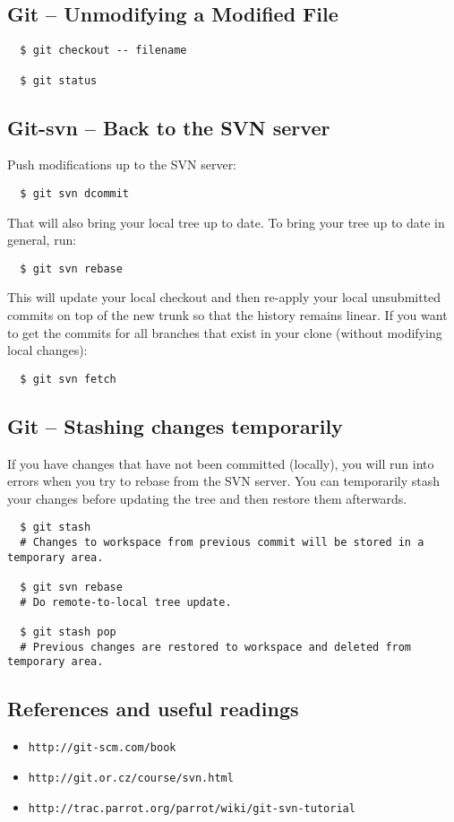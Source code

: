 \documentclass[11pt,twoside]{article}
\begin{document}
\subsection*{Git -- Unmodifying a Modified File}

\begin{verbatim}
  $ git checkout -- filename

  $ git status
\end{verbatim}

\subsection*{Git-svn -- Back to the SVN server}

Push modifications up to the SVN server:
\begin{verbatim}
  $ git svn dcommit
\end{verbatim}
That will also bring your local tree up to date. To bring your tree up to date in general, run:
\begin{verbatim}
  $ git svn rebase
\end{verbatim}
This will update your local checkout and then re-apply your local unsubmitted commits on top of the new trunk so that the history remains linear.
If you want to get the commits for all branches that exist in your clone (without modifying local changes):
\begin{verbatim}
  $ git svn fetch
\end{verbatim}

\subsection*{Git -- Stashing changes temporarily}

If you have changes that have not been committed (locally), you will run into errors when you try to rebase from the SVN server.
You can temporarily stash your changes before updating the tree and then restore them afterwards.

\begin{verbatim}
  $ git stash
  # Changes to workspace from previous commit will be stored in a temporary area.

  $ git svn rebase
  # Do remote-to-local tree update.

  $ git stash pop
  # Previous changes are restored to workspace and deleted from temporary area.
\end{verbatim}

\subsection*{References and useful readings}

\begin{itemize}
\item \verb|http://git-scm.com/book|
\item \verb|http://git.or.cz/course/svn.html|
\item \verb|http://trac.parrot.org/parrot/wiki/git-svn-tutorial|
\end{itemize}
\end{document}

